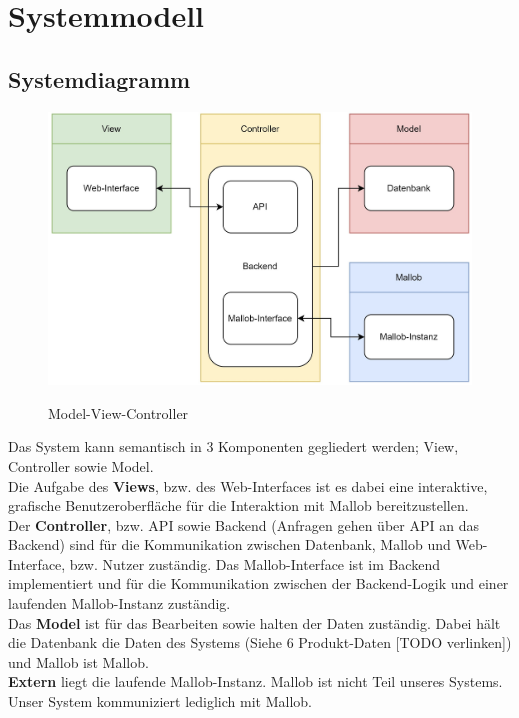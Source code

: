 \section{Systemmodell}

\subsection{Systemdiagramm}

\begin{figure}[H]
    \centering
    \includegraphics[width=\textwidth]{images-interface/Systemdiagramm3.jpg} \\
    \caption{Model-View-Controller}
\end{figure}
Das System kann semantisch in 3 Komponenten gegliedert werden; View, Controller sowie Model. \\
Die Aufgabe des \textbf{Views}, bzw. des Web-Interfaces ist es dabei eine interaktive, grafische Benutzeroberfläche für die Interaktion mit Mallob bereitzustellen. \\
Der \textbf{Controller}, bzw. API sowie Backend (Anfragen gehen über API an das Backend) sind für die Kommunikation zwischen Datenbank, Mallob und Web-Interface, bzw. Nutzer zuständig. Das Mallob-Interface ist im Backend implementiert und für die Kommunikation zwischen der Backend-Logik und einer laufenden Mallob-Instanz zuständig.\\
Das \textbf{Model} ist für das Bearbeiten sowie halten der Daten zuständig. Dabei hält die Datenbank die Daten des Systems (Siehe 6 Produkt-Daten [TODO verlinken]) und Mallob ist Mallob. \\
\textbf{Extern} liegt die laufende Mallob-Instanz. Mallob ist nicht Teil unseres Systems. Unser System kommuniziert lediglich mit Mallob.

